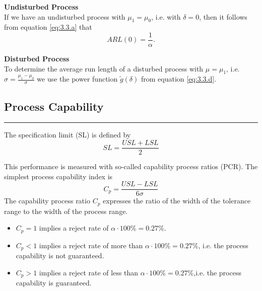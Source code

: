 \textbf{Undisturbed Process}\\
If we have an undisturbed process with $\mu_1 = \mu_0$, i.e. with $\delta = 0$, then it follows from equation \ref{eq:3.3.a} that
\begin{equation}
  ARL(0) = \frac{1}{\alpha}.
\end{equation}

\textbf{Disturbed Process}\\
To determine the average run length of a disturbed process with $\mu = \mu_1$, i.e. $\sigma = \frac{\mu_1 - \mu_0}{\sigma}$ we use the power function $\tilde{g}(\delta)$ from equation \ref{eq:3.3.d}.

\subsection{Process Capability}
\noindent\rule[\linienAbstand]{\linewidth}{\linienDicke}
The specification limit (SL) is defined by
\begin{equation}
  SL = \frac{USL + LSL}{2}
\end{equation}

This performance is measured with so-called capability process ratios (PCR). The simplest process capability index is
\begin{equation}
  C_p = \frac{USL - LSL}{6\sigma}
\end{equation}
The capability process ratio $C_p$ expresses the ratio of the width of the tolerance range to the width of the process range.

\begin{itemize}
  \item $C_p = 1$ implies a reject rate of $\alpha \cdot 100\% = 0.27\%$.
  \item $C_p < 1$ implies a reject rate of more than $\alpha \cdot 100\% = 0.27\%$, i.e. the process capability is not guaranteed.
  \item $C_p > 1$ implies a reject rate of less than $\alpha \cdot 100\% = 0.27\%$,i.e. the process capability is guaranteed.

\end{itemize}

